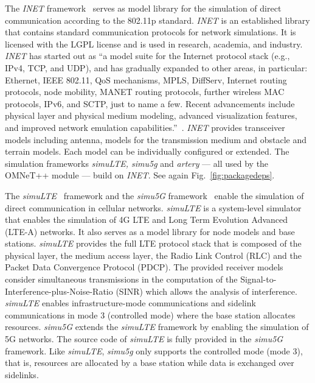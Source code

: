 The \textit{{INET}} framework~\cite{meszaros-2019-com} serves as model library for the simulation of direct communication according to the 802.11p standard. \textit{INET} is an established library that contains standard communication protocols for network simulations. It is licensed with the LGPL license and is used in research, academia, and industry. 
\textit{INET} has started out as \enquote{a model suite for the Internet protocol stack (e.g., IPv4, TCP, and UDP), and has gradually expanded to other areas, in particular: Ethernet, IEEE 802.11, QoS mechanisms, MPLS, DiffServ, Internet routing protocols, node mobility, MANET routing protocols, further wireless MAC protocols, IPv6, and SCTP, just to name a few. Recent advancements include physical layer and physical medium modeling, advanced visualization features, and improved network emulation capabilities.}~\cite{meszaros-2019-com}.  \textit{INET} provides transceiver models including antenna, models for the transmission medium and obstacle and terrain models. Each model can be individually configured or extended. The simulation frameworks  \textit{simuLTE, simu5g} and \textit{artery} --- all used by the OMNeT++ module  --- build on \textit{INET}. See again Fig.~\ref{fig:packagedeps}.


The \textit{simuLTE}~\cite{virdis-2014-com} framework and the \textit{simu5G} framework~\cite{nardini-2020b-com} enable the simulation of direct communication in cellular networks.
\textit{{simuLTE}} is a system-level simulator that enables the simulation of 4G LTE and Long Term Evolution Advanced (LTE-A) networks. It also serves as a model library for node models and base stations. \textit{simuLTE} provides the full LTE protocol stack that is composed of the physical layer, the medium access layer, the Radio Link Control (RLC) and the Packet Data Convergence Protocol (PDCP).  The provided receiver models consider simultaneous transmissions in the computation of the Signal-to-Interference-plus-Noise-Ratio (SINR) which allows the analysis of interference. \textit{simuLTE} enables infrastructure-mode communications and sidelink communications in mode 3 (controlled mode) where the base station allocates resources. \textit{{simu5G}} extends the \textit{simuLTE} framework by enabling the simulation of 5G networks. The source code of \textit{simuLTE} is fully provided in the \textit{simu5G} framework. Like \textit{simuLTE}, \textit{simu5g} only supports the controlled mode (mode 3), that is, resources are allocated by a base station while data is exchanged over sidelinks.


